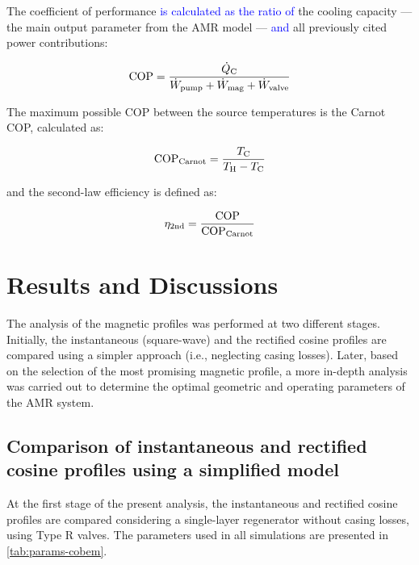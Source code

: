 \documentclass[referee]{svjour3}
\begin{document}
The coefficient of performance \textcolor{blue}{is calculated as the ratio of} the cooling capacity --- the main output parameter from the AMR model --- \textcolor{blue}{and} all previously cited power contributions:

\begin{equation}
  \label{eq:112}
  \mathrm{COP} = \frac{\dot{Q}_{\mathrm{C}}}{\dot{W}_{\mathrm{pump}} + \dot{W}_{\mathrm{mag}} + \dot{W}_{\mathrm{valve}}}
\end{equation}

The maximum possible COP between the source temperatures is the Carnot COP, calculated as:

\begin{equation}
    \label{eq:copcarnot}
    \mathrm{COP}_{\mathrm{Carnot}} = \frac{T_{\mathrm{C}}}{T_{\mathrm{H}} - T_{\mathrm{C}}}
\end{equation}

\noindent and the second-law efficiency is defined as:

\begin{equation}
    \label{eq:eta2}
    \eta_{\mathrm{2nd}} = \frac{\mathrm{COP}}{\mathrm{COP}_{\mathrm{Carnot}}}
\end{equation}{}

\section{Results and Discussions}
\label{sec:results-discussions}

The analysis of the magnetic profiles was performed at two different stages. Initially, the instantaneous (square-wave) and the rectified cosine profiles are compared using a simpler approach (i.e., neglecting casing losses). Later, based on the selection of the most promising magnetic profile, a more in-depth analysis was carried out to determine the optimal geometric and operating parameters of the AMR system.

\subsection{Comparison of instantaneous and rectified cosine profiles using a simplified model}
\label{sec:comp-cosine-inst}

At the first stage of the present analysis, the instantaneous and rectified cosine profiles are compared considering a single-layer regenerator  without casing losses, using Type R valves. The parameters used in all simulations are presented in \autoref{tab:params-cobem}.
\end{document}
